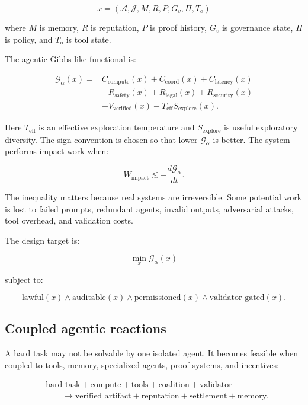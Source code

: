 \[
x=(\mathcal{A},\mathcal{J},M,R,P,G_v,\Pi,T_o)
\]

where \(M\) is memory, \(R\) is reputation, \(P\) is proof history,
\(G_v\) is governance state, \(\Pi\) is policy, and \(T_o\) is tool
state.

The agentic Gibbs-like functional is:

\[
\begin{aligned}
\mathcal{G}_{\alpha}(x)={}&
C_{\text{compute}}(x)+C_{\text{coord}}(x)+C_{\text{latency}}(x)\\
&+R_{\text{safety}}(x)+R_{\text{legal}}(x)+R_{\text{security}}(x)\\
&-V_{\text{verified}}(x)-T_{\text{eff}}S_{\text{explore}}(x).
\end{aligned}
\]

Here \(T_{\text{eff}}\) is an effective exploration temperature and
\(S_{\text{explore}}\) is useful exploratory diversity. The sign
convention is chosen so that lower \(\mathcal{G}_{\alpha}\) is better.
The system performs impact work when:

\[
\dot{W}_{\text{impact}} \lesssim -\frac{d\mathcal{G}_{\alpha}}{dt}.
\]

The inequality matters because real systems are irreversible. Some
potential work is lost to failed prompts, redundant agents, invalid
outputs, adversarial attacks, tool overhead, and validation costs.

The design target is:

\[
\boxed{
\min_x \mathcal{G}_{\alpha}(x)
}
\]

subject to:

\[
\text{lawful}(x)\land \text{auditable}(x)\land \text{permissioned}(x)\land \text{validator-gated}(x).
\]

\subsection{Coupled agentic reactions}\label{coupled-agentic-reactions}

A hard task may not be solvable by one isolated agent. It becomes
feasible when coupled to tools, memory, specialized agents, proof
systems, and incentives:

\[
\begin{aligned}
&\text{hard task}+\text{compute}+\text{tools}+\text{coalition}+\text{validator}\\
&\qquad\rightarrow\text{verified artifact}+\text{reputation}+\text{settlement}+\text{memory}.
\end{aligned}
\]

